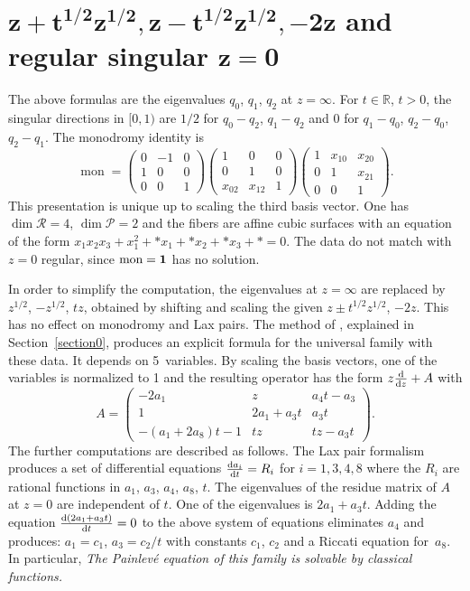 \documentclass[pdftex]{sigma}
\numberwithin{equation}{section}
\begin{document}
 \section[z plus sqrt(tz), z-sqrt(tz), -2z and regular singular z=0]{$\boldsymbol{z+t^{1/2}z^{1/2}, z-t^{1/2}z^{1/2},-2z}$ and regular singular $\boldsymbol{z=0}$}\label{four}
 The above formulas are the eigenvalues $q_0$, $q_1$, $q_2$ at $z=\infty$.
For $t\in \mathbb{R}$, $t>0$, the singular directions in $[0,1)$ are $1/2$ for $q_0-q_2$, $q_1-q_2$ and $0$ for $q_1-q_0$, $q_2-q_0$, $q_2-q_1$. The monodromy identity is
\[\operatorname{mon}= \begin{pmatrix} 0 &-1 & 0\\ 1&0 &0 \\ 0 &0 &1 \end{pmatrix}
\begin{pmatrix} 1 &0 &0 \\ 0&1 &0 \\ x_{02}& x_{12}&1 \end{pmatrix}
\begin{pmatrix} 1 &x_{10} &x_{20} \\ 0&1 &x_{21} \\ 0&0 &1 \end{pmatrix}.\]
This presentation is unique up to scaling the third basis vector.
One has $\dim \mathcal{R}=4$, $\dim \mathcal{P}=2$ and the fibers are affine cubic surfaces
with an equation of the form $x_1x_2x_3+x_1^2+*x_1+*x_2+*x_3+*=0$.
The data do not match with $z=0$ regular, since $\operatorname{mon}={\bf 1}$ has no solution.

In order to simplify the computation, the eigenvalues at $z=\infty$ are replaced by $z^{1/2}$, $-z^{1/2}$, $tz$, obtained by shifting and scaling
the given $z\pm t^{1/2}z^{1/2}$, $-2z$. This has no effect on monodromy and Lax pairs.
 The method of \cite[Section~12.5]{vdP-Si}, explained in
Section~\ref{section0}, produces an explicit formula for the universal family with these data.
 It depends on 5~variables. By scaling the basis vectors, one of the variables is normalized to 1 and the resulting operator has the form
$z\frac{{\rm d}}{{\rm d}z}+ A$ with
\[ A= \begin{pmatrix} -2a_1&z& a_4t-a_3\\ 1&2a_1+a_3t & a_3t \\ -(a_1+2a_8)t-1& tz & tz-a_3t \end{pmatrix}.\]
The further computations are described as follows.
The Lax pair formalism produces a set of differential equations $\frac{{\rm d}a_i}{{\rm d}t}=R_i$ for $i=1,3,4,8$ where the $R_i$ are rational
functions in $a_1$, $a_3$, $a_4$, $a_8$, $t$. The eigenvalues of the residue matrix of $A$ at $z=0$ are independent of $t$. One of the
eigenvalues is $2a_1+a_3t$. Adding the equation $\frac{{\rm d}(2a_1+a_3t) }{{\rm d}t}=0$ to the above system of equations eliminates $a_4$
and produces: $a_1=c_1$, $a_3=c_2/t$ with constants $c_1$, $c_2$ and a Riccati equation for~$a_8$. In particular,
 {\it The Painlev\'e equation of this family is solvable by classical functions.}
\end{document}
